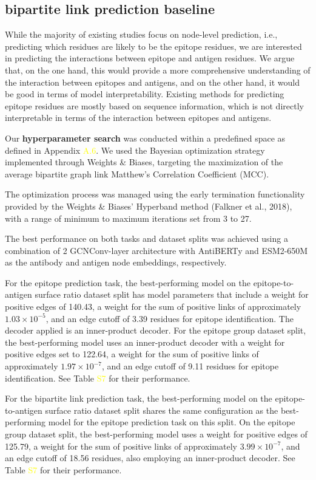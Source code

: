\documentclass[11pt]{article}
\begin{document}
\subsection{bipartite link prediction baseline}

While the majority of existing studies focus on node-level prediction, i.e., predicting which residues are likely to be the epitope residues, we are interested in predicting the interactions between epitope and antigen residues. We argue that, on the one hand, this would provide a more comprehensive understanding of the interaction between epitopes and antigens, and on the other hand, it would be good in terms of model interpretability. Existing methods for predicting epitope residues are mostly based on sequence information, which is not directly interpretable in terms of the interaction between epitopes and antigens.

Our \textbf{hyperparameter search} was conducted within a predefined space as defined in Appendix \textcolor{yellow}{A.6}. We used the Bayesian optimization strategy implemented through Weights \& Biases, targeting the maximization of the average bipartite graph link Matthew's Correlation Coefficient (MCC).

The optimization process was managed using the early termination functionality provided by the Weights \& Biases' Hyperband method (Falkner et al., 2018), with a range of minimum to maximum iterations set from 3 to 27.

The best performance on both tasks and dataset splits was achieved using a combination of 2 GCNConv-layer architecture with AntiBERTy and ESM2-650M as the antibody and antigen node embeddings, respectively.

For the epitope prediction task, the best-performing model on the epitope-to-antigen surface ratio dataset split has model parameters that include a weight for positive edges of 140.43, a weight for the sum of positive links of approximately \(1.03 \times 10^{-5}\), and an edge cutoff of 3.39 residues for epitope identification. The decoder applied is an inner-product decoder. For the epitope group dataset split, the best-performing model uses an inner-product decoder with a weight for positive edges set to 122.64, a weight for the sum of positive links of approximately \(1.97 \times 10^{-7}\), and an edge cutoff of 9.11 residues for epitope identification. See Table \textcolor{yellow}{S7} for their performance.

For the bipartite link prediction task, the best-performing model on the epitope-to-antigen surface ratio dataset split shares the same configuration as the best-performing model for the epitope prediction task on this split. On the epitope group dataset split, the best-performing model uses a weight for positive edges of 125.79, a weight for the sum of positive links of approximately \(3.99 \times 10^{-7}\), and an edge cutoff of 18.56 residues, also employing an inner-product decoder. See Table \textcolor{yellow}{S7} for their performance.
\end{document}

